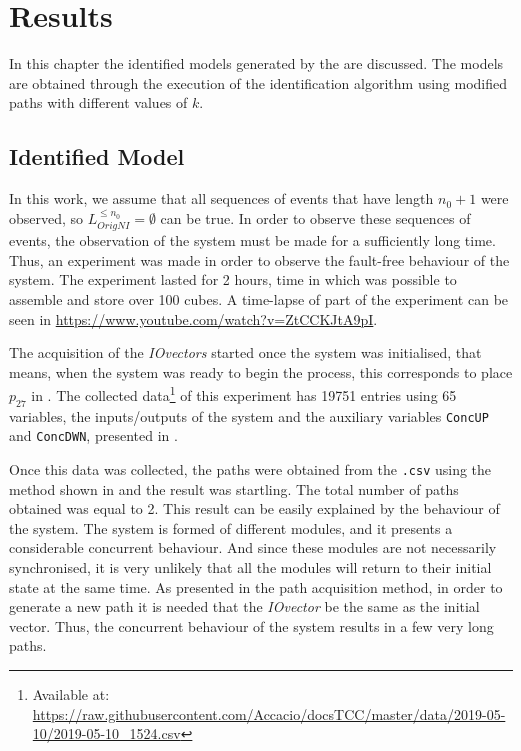 \chapter{Results}
\label{cha:results}
In this chapter the identified models generated by the
 are discussed. The models are obtained through the
execution of the identification algorithm using modified paths with different
values of $k$.

\section{Identified Model}
In this work, we assume that all
sequences of events that have length $n_0+1$ were observed, so 
$L_{OrigNI}^{\leq n_0}=\emptyset$ can be true. In order to observe these
sequences of events, the observation of the system must be made for a sufficiently
long time. Thus, an experiment was made in order to observe the fault-free
behaviour of the system. The experiment lasted for 2
hours, time in which was possible to assemble and store over 100 cubes. A time-lapse of part of the experiment can be seen in
\url{https://www.youtube.com/watch?v=ZtCCKJtA9pI}.

The acquisition of the \emph{IOvectors} started once the system was initialised, that means,
when the system was ready to begin the process, this corresponds to place
\hyperlink{partialTable:p27}{$p_{27}$} in .
The collected data\footnote{Available at:
  \url{https://raw.githubusercontent.com/Accacio/docsTCC/master/data/2019-05-10/2019-05-10_1524.csv}}
of this experiment has 19751 entries using 65
variables, the inputs\slash outputs of the system and the auxiliary variables
\verb|ConcUP| and \verb|ConcDWN|, presented in .

Once this data was collected, the paths were obtained from the \verb|.csv| using
the method shown in  and the
result was startling. The total number of paths obtained was equal to
2. This result can be easily explained by the behaviour of the system. The
system is formed of different modules, and it presents a considerable concurrent behaviour. And since these modules are not necessarily
synchronised, it is very unlikely that all the modules will return to their initial
state at the same time. As presented in the path acquisition method, in order to generate
a new path it is needed that the \emph{IOvector} be the same as the initial
vector. Thus, the concurrent behaviour of the system results in a few very long paths. 


